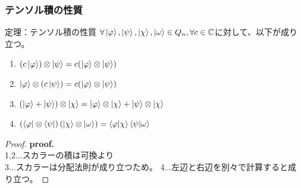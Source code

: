 \documentclass[9pt]{beamer}
\begin{document}
\begin{frame}
  \frametitle{テンソル積の性質}
  \begin{block}{定理：テンソル積の性質}
    $\forall \ket{\varphi}, \ket{\psi}, \ket{\chi}, \ket{\omega} \in Q_n, \forall c \in \mathbb{C}$に対して、以下が成り立つ。
    \begin{enumerate}
      \item $(c\ket{\varphi}) \otimes \ket{\psi} = c(\ket{\varphi} \otimes \ket{\psi} )$
      \item $\ket{\varphi} \otimes (c\ket{\psi}) = c(\ket{\varphi} \otimes \ket{\psi} )$
      \item $(\ket{\varphi} + \ket{\psi}) \otimes \ket{\chi} = \ket{\varphi} \otimes \ket{\chi} + \ket{\psi} \otimes \ket{\chi}$
      \item $\left( \bra{\varphi} \otimes \bra{\psi} \right) \left( \ket{\chi} \otimes \ket{\omega} \right) = \braket{\varphi | \chi} \braket{\psi | \omega}$
    \end{enumerate}
  \end{block}
  \begin{proof}
    \textbf{proof.} \\
    1,2$\dots$スカラーの積は可換より \\
    3$\dots$スカラーは分配法則が成り立つため。
    4$\dots$左辺と右辺を別々で計算すると成り立つ。
  \end{proof}
\end{frame}
\end{document}
